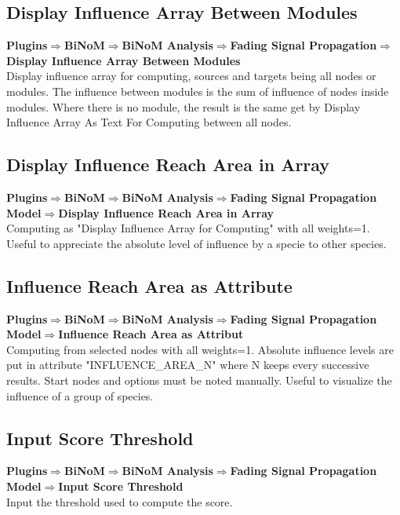 \subsection{Display Influence Array Between Modules}
\textbf{Plugins$\Rightarrow$BiNoM$\Rightarrow$BiNoM Analysis$\Rightarrow$Fading Signal Propagation$\Rightarrow$Display Influence Array Between Modules}\\
Display influence array for computing, sources and targets being all nodes or modules. The influence between modules is the sum of influence of nodes inside modules. Where there is no module, the result is the same get by Display Influence Array As Text For Computing between all nodes.

\subsection{Display Influence Reach Area in Array}
\textbf{Plugins$\Rightarrow$BiNoM$\Rightarrow$BiNoM Analysis$\Rightarrow$Fading Signal Propagation Model$\Rightarrow$Display Influence Reach Area in Array}\\
Computing as "Display Influence Array for Computing" with all weights=1. Useful to appreciate the absolute level of influence by a specie to other species.

\subsection{Influence Reach Area as Attribute}
\textbf{Plugins$\Rightarrow$BiNoM$\Rightarrow$BiNoM Analysis$\Rightarrow$Fading Signal Propagation Model$\Rightarrow$Influence Reach Area as Attribut}\\
Computing from selected nodes with all weights=1. Absolute influence levels are put in attribute "INFLUENCE\_AREA\_N" where N keeps every successive results. Start nodes and options must be noted manually. Useful to visualize the influence of a group of species.

\subsection{Input Score Threshold}
\textbf{Plugins$\Rightarrow$BiNoM$\Rightarrow$BiNoM Analysis$\Rightarrow$Fading Signal Propagation Model$\Rightarrow$Input Score Threshold}\\
Input the threshold used to compute the score. 

